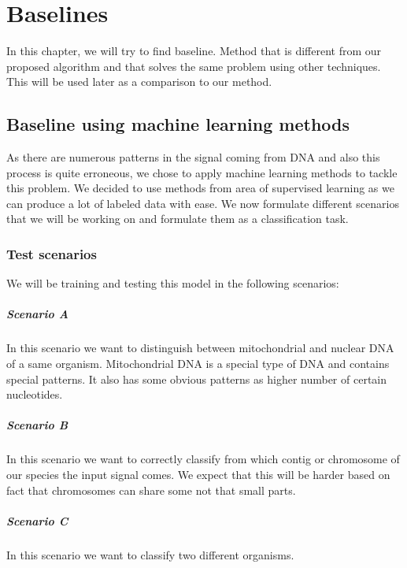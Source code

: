 \chapter{Baselines}

\label{kap:baseline} %

In this chapter, we will try to find baseline. Method that is different from our
proposed algorithm and that solves the same problem using other techniques. This
will be used later as a comparison to our method.

\section{Baseline using machine learning methods}

As there are numerous patterns in the signal coming from DNA and also this process
is quite erroneous, we chose to apply machine learning methods to tackle this problem.
We decided to use methods from area of supervised learning as we can produce a lot
of labeled data with ease. We now formulate different scenarios that we will be working
on and formulate them as a classification task.

\subsection{Test scenarios}

We will be training and testing this model in the following scenarios:

\paragraph{Scenario A} In this scenario we want to distinguish between mitochondrial and nuclear DNA
of a same organism. Mitochondrial DNA is a special type of DNA and contains special
patterns. It also has some obvious patterns as higher number of certain nucleotides.

\paragraph{Scenario B} In this scenario we want to correctly classify from which
contig or chromosome of our species the input signal comes. We expect that this
will be harder based on fact that chromosomes can share some not that small parts.

\paragraph{Scenario C} In this scenario we want to classify two different organisms.


